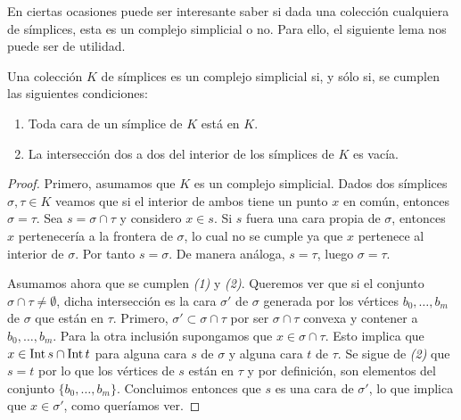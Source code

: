 En ciertas ocasiones puede ser interesante saber si dada una colección cualquiera
de símplices, esta es un complejo simplicial o no. Para ello, el siguiente lema
nos puede ser de utilidad.

\begin{lema}
	Una colección $K$ de símplices es un complejo simplicial si, y sólo si, se cumplen
	las siguientes condiciones:
	\begin{enumerate}
		\item Toda cara de un símplice de $K$ está en $K$.
		
		\item La intersección dos a dos del interior de los símplices de $K$ es vacía.
	\end{enumerate}
\end{lema}
\begin{proof}
	Primero, asumamos que $K$ es un complejo simplicial. Dados dos símplices $\sigma
	, \tau \in K$ veamos que si el interior de ambos tiene un punto $x$ en común,
	entonces $\sigma = \tau$. Sea $s = \sigma \cap \tau$ y considero $x \in s$. Si
	$s$ fuera una cara propia de $\sigma$, entonces $x$ pertenecería a la frontera
	de $\sigma$, lo cual no se cumple ya que $x$ pertenece al interior de $\sigma$.
	Por tanto $s = \sigma$. De manera análoga, $s = \tau$, luego $\sigma = \tau$.
	
	Asumamos ahora que se cumplen \textit{(1)} y \textit{(2)}. Queremos ver que si
	el conjunto $\sigma \cap \tau \neq \emptyset$, dicha intersección es la cara
	$\sigma'$ de $\sigma$ generada por los vértices $b_{0},\ldots,b_{m}$ de
	$\sigma$ que están en $\tau$. Primero, $\sigma' \subset \sigma \cap \tau$ por
	ser $\sigma \cap \tau$ convexa y contener a $b_{0}, \ldots, b_{m}$. Para la otra
	inclusión supongamos que $x \in \sigma \cap \tau$. Esto implica que
	$x \in \operatorname{Int} s \cap \operatorname{Int} t$ para alguna cara $s$ de $\sigma$ y alguna
	cara $t$ de $\tau$. Se sigue de \textit{(2)} que $s = t$ por lo que los
	vértices de $s$ están en $\tau$ y por definición, son elementos del conjunto $\{
	b_{0}, \ldots, b_{m}\}$. Concluimos entonces que $s$ es una cara de $\sigma'$,
	lo que implica que $x \in \sigma'$, como queríamos ver.
\end{proof}

